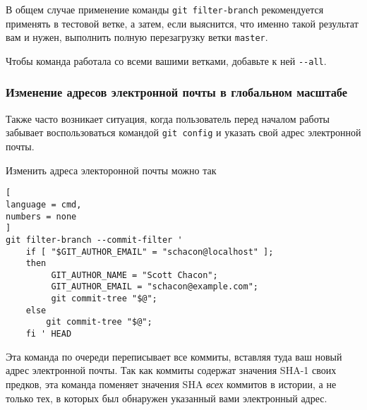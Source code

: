 \documentclass[%
	11pt,
	a4paper,
	utf8,
		]{article}
\begin{document}
В общем случае применение команды \lstinline{git filter-branch} рекомендуется применять в тестовой ветке, а затем, если выяснится, что именно такой результат вам и нужен, выполнить полную перезагрузку ветки \texttt{master}.

Чтобы команда работала со всеми вашими ветками, добавьте к ней \lstinline{--all}.

\subsubsection{Изменение адресов электронной почты в глобальном масштабе}

Также часто возникает ситуация, когда пользователь перед началом работы забывает воспользоваться командой \lstinline{git config} и указать свой адрес электронной почты.

Изменить адреса электоронной почты можно так

\begin{lstlisting}[
language = cmd,
numbers = none
]
git filter-branch --commit-filter '
    if [ "$GIT_AUTHOR_EMAIL" = "schacon@localhost" ];
    then
         GIT_AUTHOR_NAME = "Scott Chacon";
         GIT_AUTHOR_EMAIL = "schacon@example.com";
         git commit-tree "$@";
    else
        git commit-tree "$@";
    fi ' HEAD
\end{lstlisting}

Эта команда по очереди переписывает все коммиты, вставляя туда ваш новый адрес электронной почты. Так как коммиты содержат значения SHA-1 своих предков, эта команда поменяет значения SHA \emph{всех} коммитов в истории, а не только тех, в которых был обнаружен указанный вами электронный адрес.








\begin{thebibliography}{99}
	
\end{thebibliography}

\end{document}
